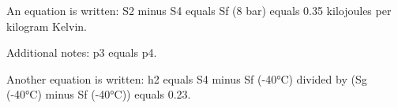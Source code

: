 An equation is written:  
S2 minus S4 equals Sf (8 bar) equals 0.35 kilojoules per kilogram Kelvin.  

Additional notes:  
p3 equals p4.  

Another equation is written:  
h2 equals S4 minus Sf (-40°C) divided by (Sg (-40°C) minus Sf (-40°C)) equals 0.23.